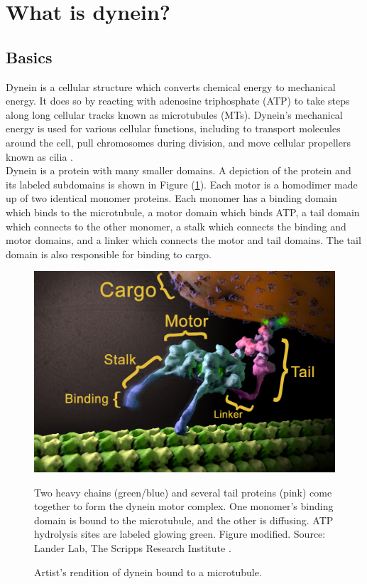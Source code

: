 \documentclass[
11pt, %
english, %
singlespacing, %
headsepline, %
chapterinoneline, %
]{MastersDoctoralThesis} %
\begin{document}


\section{What is dynein?}
\subsection{Basics}
Dynein is a cellular structure which converts chemical energy to mechanical energy. It does so by reacting with adenosine triphosphate (ATP) to take steps along long cellular tracks known as microtubules (MTs). Dynein's mechanical energy is used for various cellular functions, including to transport molecules around the cell, pull chromosomes during division, and move cellular propellers known as cilia \cite{cianfroccoreview}.\\

Dynein is a protein with many smaller domains. A depiction of the protein and its labeled subdomains is shown in Figure (\ref{dynein-artist-rendition}). Each motor is a homodimer made up of two identical monomer proteins. Each monomer has a binding domain which binds to the microtubule, a motor domain which binds ATP, a tail domain which connects to the other monomer, a stalk which connects the binding and motor domains, and a linker which connects the motor and tail domains. The tail domain is also responsible for binding to cargo.\\

\begin{figure}[h]
  \centering
  \includegraphics[width=.65\textwidth,keepaspectratio]{../../figures/dynein-artist-rendition.jpg}
  \caption{Artist's rendition of dynein bound to a microtubule.}{Two heavy chains (green/blue) and several tail proteins (pink) come together to form the dynein motor complex. One monomer's binding domain is bound to the microtubule, and the other is diffusing. ATP hydrolysis sites are labeled glowing green. Figure modified. Source: Lander Lab, The Scripps Research Institute \cite{landerartistsrendition}.}
  \label{dynein-artist-rendition}
\end{figure}
\end{document}
